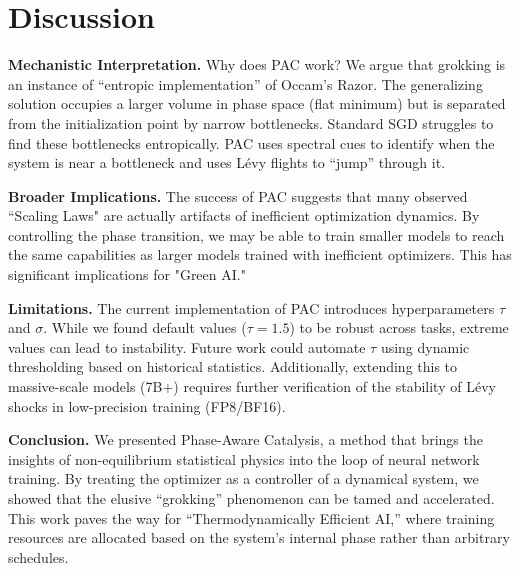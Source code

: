 \documentclass{article}
\theoremstyle{plain}
\theoremstyle{definition}
\theoremstyle{remark}
\begin{document}
\section{Discussion}
\label{sec:discussion}

\textbf{Mechanistic Interpretation.} Why does PAC work? We argue that grokking is an instance of ``entropic implementation'' of Occam's Razor. The generalizing solution occupies a larger volume in phase space (flat minimum) but is separated from the initialization point by narrow bottlenecks. Standard SGD struggles to find these bottlenecks entropically. PAC uses spectral cues to identify when the system is near a bottleneck and uses Lévy flights to ``jump'' through it.

\textbf{Broader Implications.} The success of PAC suggests that many observed ``Scaling Laws" are actually artifacts of inefficient optimization dynamics. By controlling the phase transition, we may be able to train smaller models to reach the same capabilities as larger models trained with inefficient optimizers. This has significant implications for "Green AI."

\textbf{Limitations.} The current implementation of PAC introduces hyperparameters $\tau$ and $\sigma$. While we found default values ($\tau=1.5$) to be robust across tasks, extreme values can lead to instability. Future work could automate $\tau$ using dynamic thresholding based on historical statistics. Additionally, extending this to massive-scale models (7B+) requires further verification of the stability of Lévy shocks in low-precision training (FP8/BF16).

\textbf{Conclusion.} We presented Phase-Aware Catalysis, a method that brings the insights of non-equilibrium statistical physics into the loop of neural network training. By treating the optimizer as a controller of a dynamical system, we showed that the elusive ``grokking'' phenomenon can be tamed and accelerated. This work paves the way for ``Thermodynamically Efficient AI,'' where training resources are allocated based on the system's internal phase rather than arbitrary schedules.






\newpage
\appendix
\onecolumn
\end{document}
